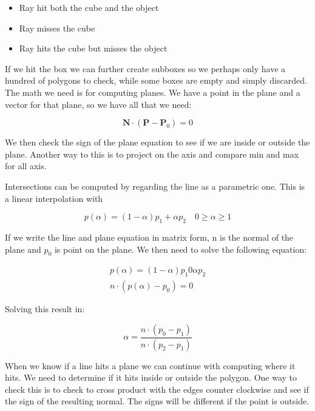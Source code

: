 	\begin{itemize}
		\item Ray hit both the cube and the object
		\item Ray misses the cube
		\item Ray hits the cube but misses the object
	\end{itemize}

If we hit the box we can further create subboxes so we perhaps only have a hundred of polygons to check, while some boxes are empty and simply discarded. The math we need is for computing planes. We have a point in the plane and a vector for that plane, so we have all that we need:

	\begin{equation}
		\textbf{N} \cdot (\textbf{P}-\textbf{P}_0) = 0
	\end{equation}

We then check the sign of the plane equation to see if we are inside or outside the plane. Another way to this is to project on the axis and compare min and max for all axis.

Intersections can be computed by regarding the line as a parametric one. This is a linear interpolation with

	\begin{equation}
		p(\alpha) = (1-\alpha)p_1 + \alpha p_2 \quad 0 \ge \alpha \ge 1 
	\end{equation}

If we write the line and plane equation in matrix form, n is the normal of the plane and $p_0$ is point on the plane. We then need to solve the following equation:

	\begin{equation}
	\begin{aligned}
		p(\alpha) = (1-\alpha) p_1 0 \alpha p_2 \\
		 n \cdot (p(\alpha)-p_0) = 0
	\end{aligned}
	\end{equation}

Solving this result in:

	\begin{equation}
	\alpha = \frac{n \cdot (p_0 -p_1)} {n \cdot (p_2 - p_1)} 
	\end{equation}

When we know if a line hits a plane we can continue with computing where it hits. We need to determine if it hits inside or outside the polygon. One way to check this is to check to cross product with the edges counter clockwise and see if the sign of the resulting normal.  The signs will be different if the point is outside. 


